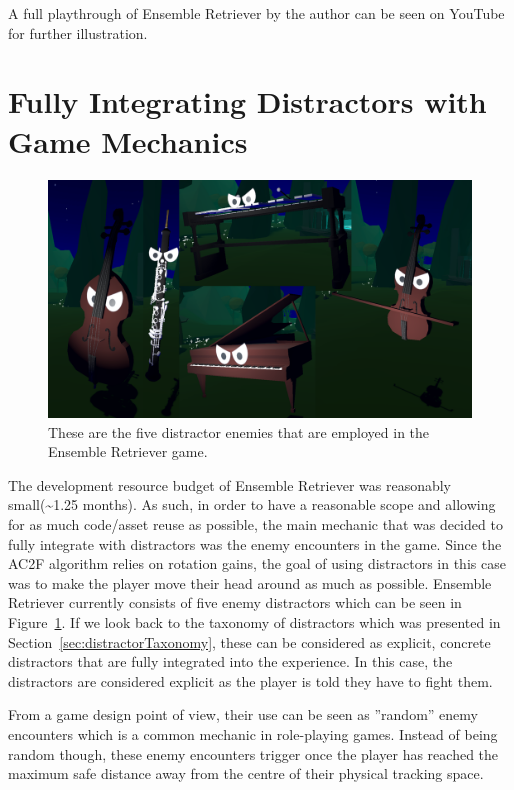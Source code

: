 A full playthrough of Ensemble Retriever by the author can be seen on YouTube~\cite{ERPlaythrough} for further illustration.

\section{Fully Integrating Distractors with Game Mechanics}
\begin{figure}[tbph]
    \centering
    \includegraphics[width=1\textwidth]{figures/screenshots/Distractors.png}
    \caption[The Distractors of Ensemble Retriever]{These are the five distractor enemies that are employed in the Ensemble Retriever game.}
    \label{fig:allDistractors}
\end{figure}

The development resource budget of Ensemble Retriever was reasonably small(\textasciitilde1.25 months). As such, in order to have a reasonable scope and allowing for as much code/asset reuse as possible, the main mechanic that was decided to fully integrate with distractors was the enemy encounters in the game. Since the AC2F algorithm relies on rotation gains, the goal of using distractors in this case was to make the player move their head around as much as possible. Ensemble Retriever currently consists of five enemy distractors which can be seen in Figure~\ref{fig:allDistractors}. If we look back to the taxonomy of distractors which was presented in Section~\ref{sec:distractorTaxonomy}, these can be considered as explicit, concrete distractors that are fully integrated into the experience. In this case, the distractors are considered explicit as the player is told they have to fight them. 

From a game design point of view, their use can be seen as ''random'' enemy encounters which is a common mechanic in role-playing games. Instead of being random though, these enemy encounters trigger once the player has reached the maximum safe distance away from the centre of their physical tracking space. 

